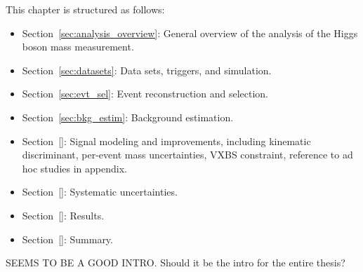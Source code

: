 This chapter is structured as follows:
\begin{itemize}                                                                          
    \item Section~\ref{sec:analysis_overview}: General overview of the analysis of the Higgs boson mass measurement.
    \item Section~\ref{sec:datasets}: Data sets, triggers, and simulation.
    \item Section~\ref{sec:evt_sel}: Event reconstruction and selection.
    \item Section~\ref{sec:bkg_estim}: Background estimation.
    \item Section~\ref{}: Signal modeling and improvements, including kinematic discriminant, per-event mass uncertainties, VXBS constraint, reference to ad hoc studies in appendix.
    \item Section~\ref{}: Systematic uncertainties.
    \item Section~\ref{}: Results.
    \item Section~\ref{}: Summary.
\end{itemize}

SEEMS TO BE A GOOD INTRO. Should it be the intro for the entire thesis?
